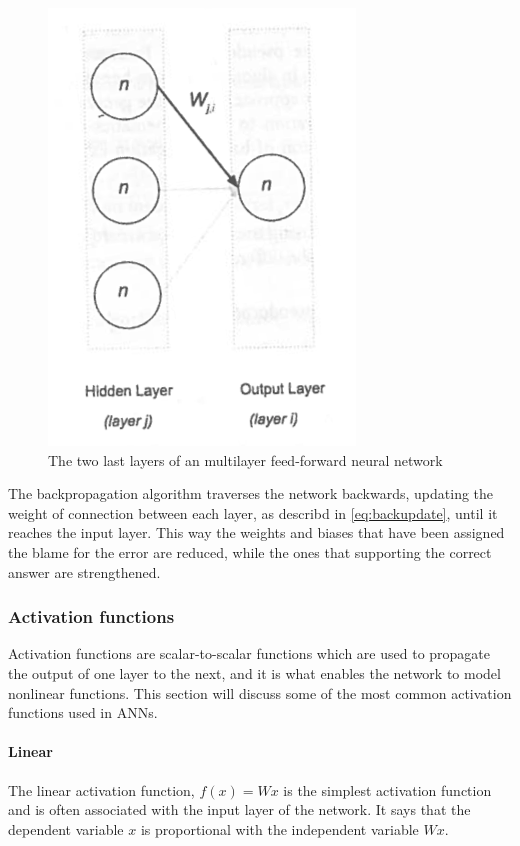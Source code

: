 \begin{figure}[!h]
	\centering
	\includegraphics[scale=1]{fig/backpropagation_two_layers.png}
	\caption{The two last layers of an multilayer feed-forward neural network \cite{Patterson2017}}
	\label{fig:backpropagationtwolayers}
\end{figure}

The backpropagation algorithm traverses the network backwards, updating the weight of connection between each layer, as describd in \autoref{eq:backupdate}, until it reaches the input layer. This way the weights and biases that have been assigned the blame for the error are reduced, while the ones that supporting the correct answer are strengthened. 

\subsubsection{Activation functions}
Activation functions are scalar-to-scalar functions which are used to propagate the output of one layer to the next, and it is what enables the network to model nonlinear functions. This section will discuss some of the most common activation functions used in ANNs.

\paragraph{Linear}
The linear activation function, $f(x) = Wx$ is the simplest activation function and is often associated with the input layer of the network. It says that the dependent variable $x$ is proportional with the independent variable $Wx$.

